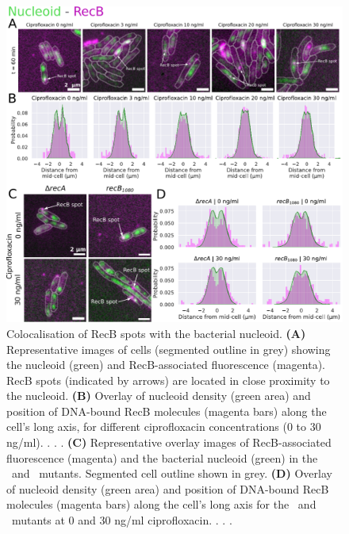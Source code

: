 \begin{figure}[htbp]
    \centering
    \includegraphics[width=.8\textwidth]{Figures/Fig4_nucleoid.pdf}
    \caption{Colocalisation of RecB spots with the bacterial nucleoid. \textbf{(A)} Representative images of cells (segmented outline in grey) showing the nucleoid (green) and RecB-associated fluorescence (magenta). RecB spots (indicated by arrows) are located in close proximity to the nucleoid. \textbf{(B)} Overlay of nucleoid density (green area) and position of DNA-bound RecB molecules (magenta bars) along the cell's long axis, for different ciprofloxacin concentrations (0 to 30 ng/ml). . . . \textbf{(C)} Representative overlay images of RecB-associated fluorescence (magenta) and the bacterial nucleoid (green) in the \dreca\ and \geneteneighty\ mutants. Segmented cell outline shown in grey. \textbf{(D)} Overlay of nucleoid density (green area) and position of DNA-bound RecB molecules (magenta bars) along the cell's long axis for the \dreca\ and \geneteneighty\ mutants at 0 and 30 ng/ml ciprofloxacin. . . .}
    \label{Fig:nucleoid}
\end{figure}

